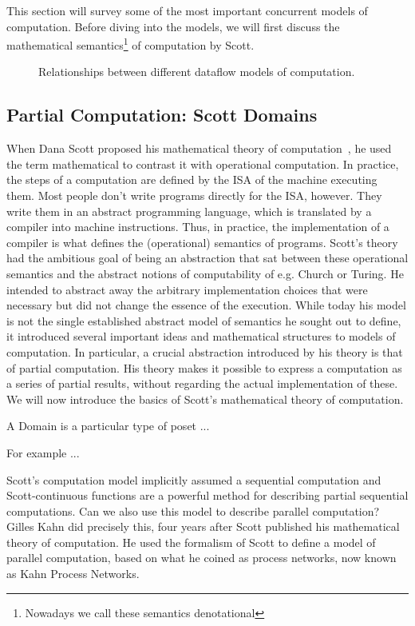 This section will survey some of the most important concurrent models of computation. Before diving into the models, we will first discuss the mathematical semantics\footnote{Nowadays we call these semantics denotational} of computation by Scott.

\begin{figure}[h]
	\centering
   \resizebox{0.55\textwidth}{!}{}
	\caption{Relationships between different dataflow models of computation.}
	\label{fig:dataflow_mocs}
\end{figure}

\subsection{Partial Computation: Scott Domains}

When Dana Scott proposed his mathematical theory of computation~\cite{scott1970}, he used the term mathematical to contrast it with operational computation.
In practice, the steps of a computation are defined by the \ac{ISA} of the machine executing them.
Most people don't write programs directly for the \ac{ISA}, however. They write them in an abstract programming language, which is translated by a compiler into machine instructions.
Thus, in practice, the implementation of a compiler is what defines the (operational) semantics of programs.
Scott's theory had the ambitious goal of being an abstraction that sat between these operational semantics and the abstract notions of computability of e.g. Church or Turing.
He intended to abstract away the arbitrary implementation choices that were necessary but did not change the essence of the execution.
While today his model is not the single established abstract model of semantics he sought out to define, it introduced several important ideas and mathematical structures to models of computation.
In particular, a crucial abstraction introduced by his theory is that of partial computation.
His theory makes it possible to express a computation as a series of partial results, without regarding the actual implementation of these.
We will now introduce the basics of Scott's mathematical theory of computation.


A Domain is a particular type of \ac{poset} ... 

For example ...


Scott's computation model implicitly assumed a sequential computation and Scott-continuous functions are a powerful method for describing partial sequential computations.
Can we also use this model to describe parallel computation?
Gilles Kahn did precisely this, four years after Scott published his mathematical theory of computation. 
He used the formalism of Scott to define a model of parallel computation, based on what he coined as process networks, now known as Kahn Process Networks.

